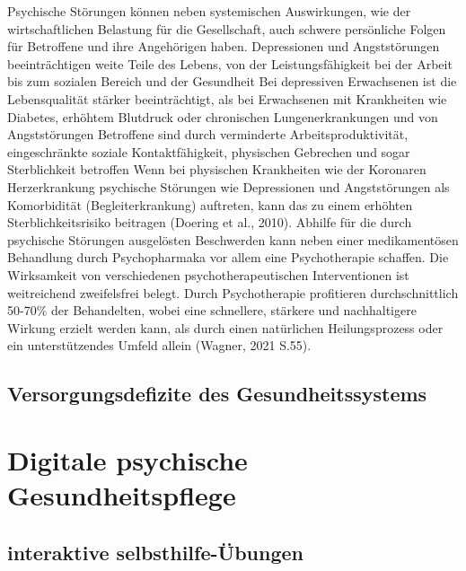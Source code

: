 Psychische Störungen können neben systemischen Auswirkungen, wie der wirtschaftlichen Belastung für die Gesellschaft, auch schwere persönliche Folgen für Betroffene und ihre Angehörigen haben. Depressionen und Angststörungen beeinträchtigen weite Teile des Lebens, von der Leistungsfähigkeit bei der Arbeit bis zum sozialen Bereich und der Gesundheit \parencite{brenes2007anxiety} %
Bei depressiven Erwachsenen ist die Lebensqualität stärker beeinträchtigt, als bei Erwachsenen mit Krankheiten wie Diabetes, erhöhtem Blutdruck oder chronischen Lungenerkrankungen und von Angststörungen Betroffene sind durch verminderte Arbeitsproduktivität, eingeschränkte soziale Kontaktfähigkeit, physischen Gebrechen und sogar Sterblichkeit betroffen \parencite{weisel2021digital,brenes2007anxiety}  %
Wenn bei physischen Krankheiten wie der Koronaren Herzerkrankung psychische Störungen wie Depressionen und Angststörungen als Komorbidität (Begleiterkrankung) auftreten, kann das zu einem erhöhten Sterblichkeitsrisiko beitragen (Doering et al., 2010). 
Abhilfe für die durch psychische Störungen ausgelösten Beschwerden kann neben einer medikamentösen Behandlung durch Psychopharmaka vor allem eine Psychotherapie schaffen. Die Wirksamkeit von verschiedenen psychotherapeutischen Interventionen ist weitreichend zweifelsfrei belegt. Durch Psychotherapie profitieren durchschnittlich 50-70\% der Behandelten, wobei eine schnellere, stärkere und nachhaltigere Wirkung erzielt werden kann, als durch einen natürlichen Heilungsprozess oder ein unterstützendes Umfeld allein (Wagner, 2021 S.55).



\subsection{Versorgungsdefizite des Gesundheitssystems}\label{subsubsec:versorgungsdefizite}



\section{Digitale psychische Gesundheitspflege}\label{subsec:digitale_psychische_gesundheit}


\subsection{interaktive selbsthilfe-Übungen}\label{subsubsec:interaktive_selbsthilfe_uebungen}

